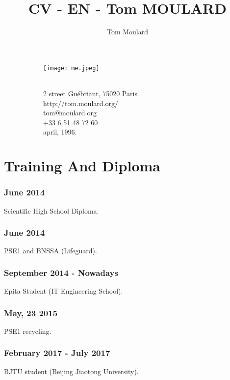\documentclass{article}
\begin{document}
    \title{CV - EN - Tom MOULARD}

    \author{Tom Moulard}


    \begin{center}
        \begin{figure}
            \centering
            \begin{subfigure}[b]{0.3\textwidth}
                \texttt{[image: me.jpeg]}
            \end{subfigure}
            \begin{subfigure}[b]{0.3\textwidth}
                {\huge\bfseries\theauthor}\\
                \vspace{.25em}
                2 street Gu\'ebriant, 75020 Paris\\
                http://tom.moulard.org/\\
                tom@moulard.org\\
                +33 6 51 48 72 60\\
                april,  1996.
            \end{subfigure}
        \end{figure}
    \end{center}

    \section{Training And Diploma}
        \subsubsection{June 2014}
            Scientific High School Diploma.
        \subsubsection{June 2014}
            PSE1 and BNSSA (Lifeguard).
        \subsubsection{September 2014 - Nowadays}
            Epita Student (IT Engineering School).
        \subsubsection{May, 23 2015}
            PSE1 recycling.
        \subsubsection{February 2017 - July 2017}
            BJTU student (Beijing Jiaotong University).
\end{document}
